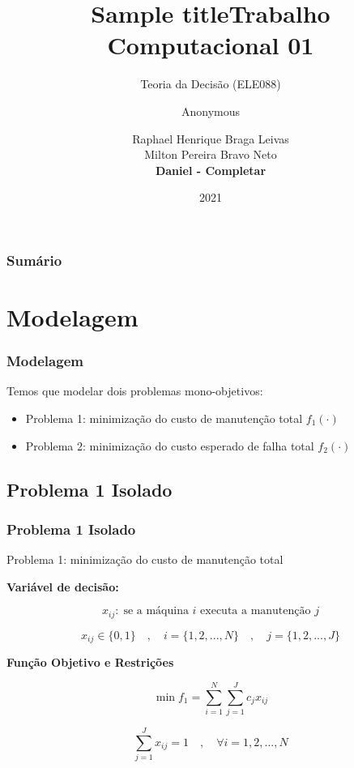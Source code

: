 \documentclass{beamer}
\title{Sample title}
\author{Anonymous}
\institute{Overleaf}
\date{2021}
\title[Short Paper Title]  
{Trabalho Computacional 01}
\subtitle
{Teoria da Decisão (ELE088)}
\author 
 { Raphael Henrique Braga Leivas \\
 Milton Pereira Bravo Neto \\ 
 \textbf{Daniel - Completar}}
\institute 
{
Curso de Bacharelado em Engenharia de Sistemas\\
Universidade Federal de Minas Gerais
}
\newcommand{\un}[1]{\;\text{#1}}
\begin{document}
\begin{frame}
    \titlepage
\end{frame}

\begin{frame}
    \frametitle{Sumário}
    \tableofcontents
\end{frame}

\section{Modelagem}

    \begin{frame}
        \frametitle{Modelagem}
        Temos que modelar dois problemas mono-objetivos:
        \vspace{1cm}

        \begin{itemize}
            \item Problema 1: minimização do custo de manutenção total $f_1 (\cdot)$
             \vspace{1cm}
            \item Problema 2: minimização do custo esperado de falha total $f_2 (\cdot)$
        \end{itemize}
    \end{frame}

    \subsection{Problema 1 Isolado}
    \begin{frame}
        \frametitle{Problema 1 Isolado}

        \begin{center}
            Problema 1: minimização do custo de manutenção total
        \end{center}

        \vspace{0.5cm}

        \textbf{Variável de decisão:}

        \[  x_{ij}: \un{se a máquina $i$ executa a manutenção $j$}  \]
        
        \[ x_{ij} \in \{0,1\} \quad , \quad i = \{1, 2, ..., N\}  \quad , \quad j = \{1, 2, ..., J\} \]

        \vspace{0.5cm}

        \textbf{Função Objetivo e Restrições}

        \[  \min f_1 = \sum_{i=1}^{N} \sum_{j=1}^{J} c_j x_{ij} \]

        \[ \sum_{j=1}^{J} x_{ij} = 1 \quad , \quad \forall i = {1, 2, ..., N} \]
    \end{frame}
\end{document}
